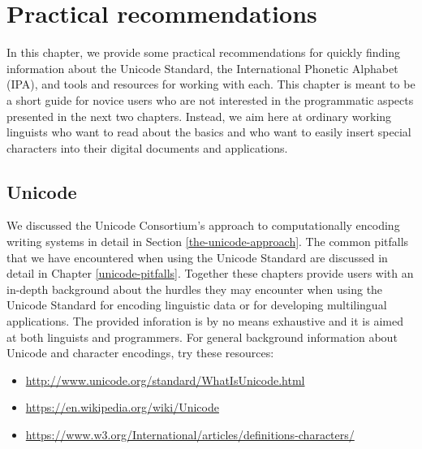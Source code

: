 \chapter{Practical recommendations}
\label{practical-recommendations}


In this chapter, we provide some practical recommendations for quickly finding information about the Unicode Standard, the International Phonetic Alphabet (IPA), and tools and resources for working with each. This chapter is meant to be a short guide for novice users who are not interested in the programmatic aspects presented in the next two chapters. Instead, we aim here at ordinary working linguists who want to read about the basics and who want to easily insert special characters into their digital documents and applications.

\section{Unicode}
We discussed the Unicode Consortium's approach to computationally encoding writing systems in detail in Section \ref{the-unicode-approach}. The common pitfalls that we have encountered when using the Unicode Standard are discussed in detail in Chapter \ref{unicode-pitfalls}. Together these chapters provide users with an in-depth background about the hurdles they may encounter when using the Unicode Standard for encoding linguistic data or for developing multilingual applications. The provided inforation is by no means exhaustive and it is aimed at both linguists and programmers. For general background information about Unicode and character encodings, try these resources:

\begin{itemize}
	\item \url{http://www.unicode.org/standard/WhatIsUnicode.html}
	\item \url{https://en.wikipedia.org/wiki/Unicode}
	\item \url{https://www.w3.org/International/articles/definitions-characters/}
\end{itemize}

